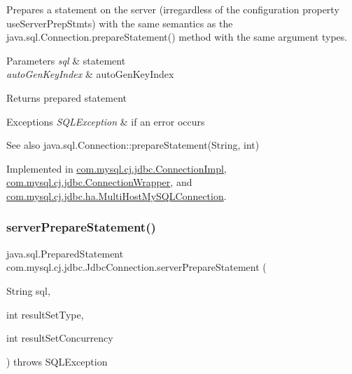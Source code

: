 Prepares a statement on the server (irregardless of the configuration property \textquotesingle{}use\+Server\+Prep\+Stmts\textquotesingle{}) with the same semantics as the java.\+sql.\+Connection.\+prepare\+Statement() method with the same argument types.


\begin{DoxyParams}{Parameters}
{\em sql} & statement \\
\hline
{\em auto\+Gen\+Key\+Index} & auto\+Gen\+Key\+Index \\
\hline
\end{DoxyParams}
\begin{DoxyReturn}{Returns}
prepared statement 
\end{DoxyReturn}

\begin{DoxyExceptions}{Exceptions}
{\em S\+Q\+L\+Exception} & if an error occurs \\
\hline
\end{DoxyExceptions}
\begin{DoxySeeAlso}{See also}
java.\+sql.\+Connection\+::prepare\+Statement(\+String, int) 
\end{DoxySeeAlso}


Implemented in \mbox{\hyperlink{classcom_1_1mysql_1_1cj_1_1jdbc_1_1_connection_impl_abd651a25d34961e6b9e8b5938f57222f}{com.\+mysql.\+cj.\+jdbc.\+Connection\+Impl}}, \mbox{\hyperlink{classcom_1_1mysql_1_1cj_1_1jdbc_1_1_connection_wrapper_a86037101987ec03d10b75dbba23a8dff}{com.\+mysql.\+cj.\+jdbc.\+Connection\+Wrapper}}, and \mbox{\hyperlink{classcom_1_1mysql_1_1cj_1_1jdbc_1_1ha_1_1_multi_host_my_s_q_l_connection_a26a0ffb4b44f358479e5a39a3241837f}{com.\+mysql.\+cj.\+jdbc.\+ha.\+Multi\+Host\+My\+S\+Q\+L\+Connection}}.

\mbox{\label{interfacecom_1_1mysql_1_1cj_1_1jdbc_1_1_jdbc_connection_aa0692efe53cb2eea133274bedbacd26a}} 
\subsubsection{\texorpdfstring{server\+Prepare\+Statement()}{serverPrepareStatement()}\hspace{0.1cm}{\footnotesize\ttfamily [3/6]}}
{\footnotesize\ttfamily java.\+sql.\+Prepared\+Statement com.\+mysql.\+cj.\+jdbc.\+Jdbc\+Connection.\+server\+Prepare\+Statement (\begin{DoxyParamCaption}\item[{String}]{sql,  }\item[{int}]{result\+Set\+Type,  }\item[{int}]{result\+Set\+Concurrency }\end{DoxyParamCaption}) throws S\+Q\+L\+Exception}

